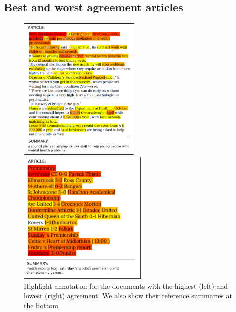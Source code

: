 \documentclass[11pt,a4paper]{article}
\begin{document}
\subsection{Best and worst agreement articles}
\begin{figure}[h]
    \centering
    \begin{minipage}{.45\textwidth}
    \centering
    \includegraphics[height=7cm]{heatmap_best}
    \end{minipage}
    \begin{minipage}{.45\textwidth}
    \centering
    \includegraphics[height=6.5cm]{heatmap_negative}
    \end{minipage}
    \caption{Highlight annotation for the documents with the highest (left) and lowest (right) agreement. We also show their reference summaries at the bottom.}
  \label{image:heatmap_both}
\end{figure}
\newpage
\end{document}
